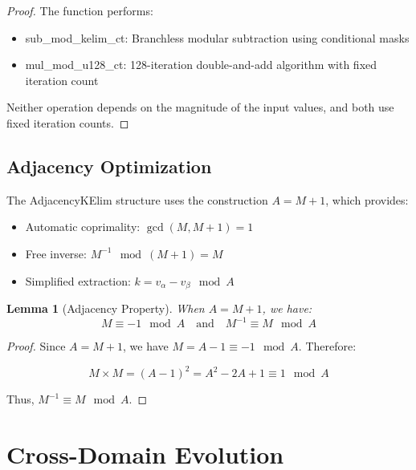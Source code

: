 \documentclass[11pt,letterpaper]{article}
\newtheorem{lemma}[theorem]{Lemma}
\begin{document}
\begin{proof}
The function performs:

\begin{itemize}
\item {\ttfamily sub\_mod\_kelim\_ct}: Branchless modular subtraction using conditional masks
\item {\ttfamily mul\_mod\_u128\_ct}: 128-iteration double-and-add algorithm with fixed iteration count
\end{itemize}

Neither operation depends on the magnitude of the input values, and both use fixed iteration counts.
\end{proof}

\subsection{Adjacency Optimization}

The {\ttfamily AdjacencyKElim} structure uses the construction \(A = M + 1\), which provides:

\begin{itemize}
\item Automatic coprimality: \(\gcd(M, M+1) = 1\)
\item Free inverse: \(M^{-1} \mod (M+1) = M\)
\item Simplified extraction: \(k = v_{\alpha} - v_{\beta} \mod A\)
\end{itemize}

\begin{lemma}[Adjacency Property]
\label{lem:adjacency}
When \(A = M + 1\), we have:
\begin{equation*}
M \equiv -1 \mod A \quad \text{and} \quad M^{-1} \equiv M \mod A
\end{equation*}
\end{lemma}

\begin{proof}
Since \(A = M + 1\), we have \(M = A - 1 \equiv -1 \mod A\). Therefore:

\begin{equation*}
M \times M = (A - 1)^2 = A^2 - 2A + 1 \equiv 1 \mod A
\end{equation*}

Thus, \(M^{-1} \equiv M \mod A\).
\end{proof}

\newpage

\section{Cross-Domain Evolution}
\label{sec:cross-domain}
\end{document}

